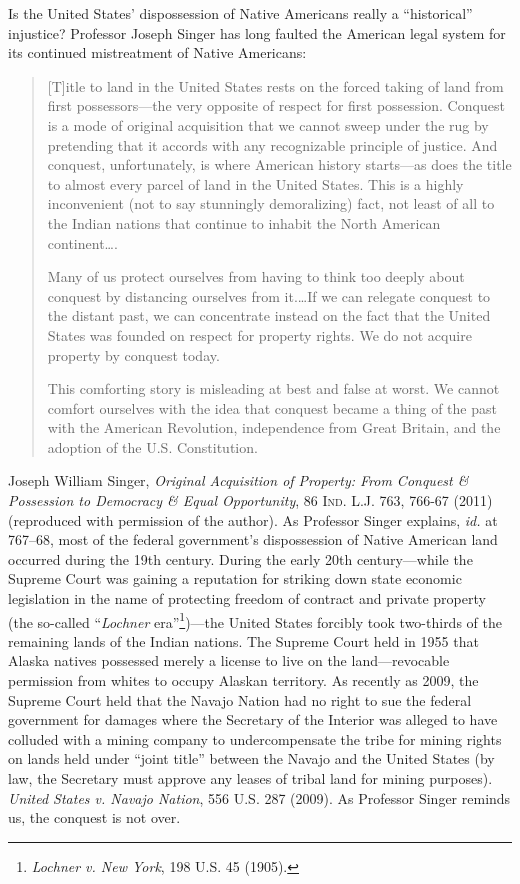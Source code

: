 Is the United States' dispossession of Native Americans really a
``historical'' injustice? Professor Joseph Singer has long faulted the American
legal system for its continued mistreatment of Native Americans:
\begin{quotation}
[T]itle to land in the United States rests on the forced taking of land from
first possessors---the very opposite of respect for first possession. Conquest
is a mode of original acquisition that we cannot sweep under the rug by
pretending that it accords with any recognizable principle of justice. And
conquest, unfortunately, is where American history starts---as does the title to
almost every parcel of land in the United States. This is a highly inconvenient
(not to say stunningly demoralizing) fact, not least of all to the Indian
nations that continue to inhabit the North American continent\ldots .

Many of us protect ourselves from having to think too deeply about conquest by
distancing ourselves from it.\ldots If we can relegate conquest to the distant
past, we can concentrate instead on the fact that the United States was founded
on respect for property rights. We do not acquire property by conquest today.

This comforting story is misleading at best and false at worst. We cannot
comfort ourselves with the idea that conquest became a thing of the past with
the American Revolution, independence from Great Britain, and the adoption of
the U.S. Constitution.
\end{quotation}
Joseph William Singer, \textit{Original Acquisition of Property: From Conquest
\& Possession to Democracy \& Equal Opportunity}, 86 \textsc{Ind. L.J.} 763,
766-67 (2011) (reproduced with permission of the author). As Professor Singer
explains, \textit{id.} at 767--68, most of the federal government's
dispossession
of Native American land occurred during the 19th century. During the early 20th
century---while the Supreme Court was gaining a reputation for striking down
state economic legislation in the name of protecting freedom of contract and
private property (the so-called ``\textit{Lochner} era''\footnote{\emph{Lochner
v. New York}, 198 U.S. 45 (1905).})---the United States forcibly took
two-thirds of the remaining lands of the Indian nations. The Supreme Court held
in 1955 that Alaska natives possessed merely a license to live on the
land---revocable permission from whites to occupy Alaskan territory. As recently
as 2009, the Supreme Court held that the Navajo Nation had no right to sue the
federal government for damages where the Secretary of the Interior was alleged
to have colluded with a mining company to undercompensate the tribe for mining
rights on lands held under ``joint title'' between the Navajo and the United
States (by law, the Secretary must approve any leases of tribal land for mining
purposes). \textit{United States v. Navajo Nation}, 556 U.S. 287 (2009). As
Professor Singer reminds us, the conquest is not over.

